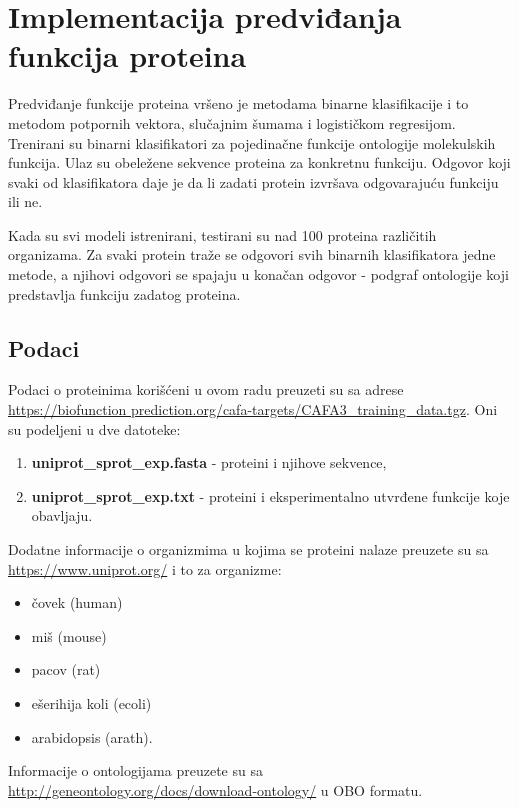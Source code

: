 \chapter{Implementacija predviđanja funkcija proteina}
\label{Chapter5}

Predviđanje funkcije proteina vršeno je metodama binarne klasifikacije i to metodom potpornih vektora, slučajnim šumama i logističkom regresijom. Trenirani su binarni klasifikatori za pojedinačne funkcije ontologije molekulskih funkcija. Ulaz su obeležene sekvence proteina za konkretnu funkciju. Odgovor koji svaki od klasifikatora daje je da li zadati protein izvršava odgovarajuću funkciju ili ne.

Kada su svi modeli istrenirani, testirani su nad 100 proteina različitih organizama. Za svaki protein traže se odgovori svih binarnih klasifikatora jedne metode, a njihovi odgovori se spajaju u konačan odgovor - podgraf ontologije koji predstavlja funkciju zadatog proteina.



\section{Podaci}

Podaci o proteinima korišćeni u ovom radu preuzeti su sa adrese \href{https://biofunctionprediction.org/cafa-targets/CAFA3_training_data.tgz}{https://biofunction prediction.org/cafa-targets/CAFA3\_training\_data.tgz}. Oni su podeljeni u dve datoteke:

\begin{enumerate}
	\item \textbf{uniprot\_sprot\_exp.fasta} - proteini i njihove sekvence,
	\item \textbf{uniprot\_sprot\_exp.txt} - proteini i eksperimentalno utvrđene funkcije koje obavljaju.
\end{enumerate}

Dodatne informacije o organizmima u kojima se proteini nalaze preuzete su sa \url{https://www.uniprot.org/} i to za organizme:
	\begin{itemize}
		\item čovek (human)
		\item miš (mouse)
		\item pacov (rat)
		\item ešerihija koli (ecoli)
		\item arabidopsis (arath).
	\end{itemize}


Informacije o ontologijama preuzete su sa  \href{http://geneontology.org/docs/download-ontology/}{http://geneontology.org/docs/download-ontology/} u OBO formatu. 

